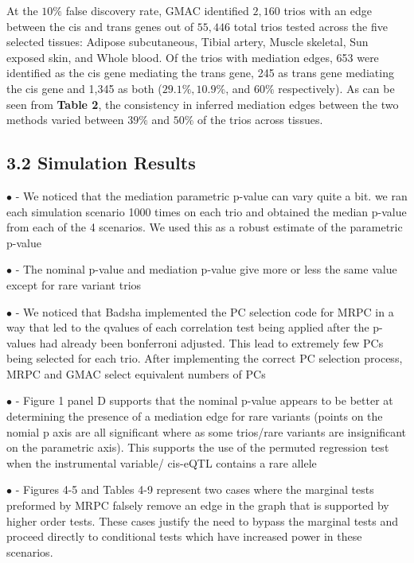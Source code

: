 \documentclass[
]{article}
\begin{document}
At the \(10\%\) false discovery rate, GMAC identified \(2,160\) trios
with an edge between the cis and trans genes out of \(55,446\) total
trios tested across the five selected tissues: Adipose subcutaneous,
Tibial artery, Muscle skeletal, Sun exposed skin, and Whole blood. Of
the trios with mediation edges, 653 were identified as the cis gene
mediating the trans gene, 245 as trans gene mediating the cis gene and
1,345 as both (\(29.1\%, 10.9\%\), and \(60\%\) respectively). As can be
seen from \textbf{Table 2}, the consistency in inferred mediation edges
between the two methods varied between \(39\%\) and \(50\%\) of the
trios across tissues.

\subsection*{3.2 Simulation Results}

\(\bullet\) - We noticed that the mediation parametric p-value can vary
quite a bit. we ran each simulation scenario 1000 times on each trio and
obtained the median p-value from each of the 4 scenarios. We used this
as a robust estimate of the parametric p-value

\(\bullet\) - The nominal p-value and mediation p-value give more or
less the same value except for rare variant trios

\(\bullet\) - We noticed that Badsha implemented the PC selection code
for MRPC in a way that led to the qvalues of each correlation test being
applied after the p-values had already been bonferroni adjusted. This
lead to extremely few PCs being selected for each trio. After
implementing the correct PC selection process, MRPC and GMAC select
equivalent numbers of PCs

\(\bullet\) - Figure 1 panel D supports that the nominal p-value appears
to be better at determining the presence of a mediation edge for rare
variants (points on the nomial p axis are all significant where as some
trios/rare variants are insignificant on the parametric axis). This
supports the use of the permuted regression test when the instrumental
variable/ cis-eQTL contains a rare allele

\(\bullet\) - Figures 4-5 and Tables 4-9 represent two cases where the
marginal tests preformed by MRPC falsely remove an edge in the graph
that is supported by higher order tests. These cases justify the need to
bypass the marginal tests and proceed directly to conditional tests
which have increased power in these scenarios.
\end{document}
